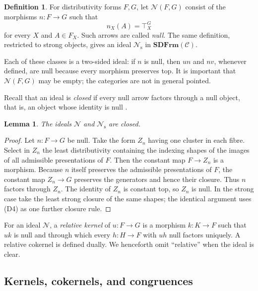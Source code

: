 \documentclass[12pt,oneside,reqno]{amsart}
\newtheorem{lemma}[theorem]{Lemma}
\theoremstyle{definition}
\newtheorem{definition}[theorem]{Definition}
\theoremstyle{remark}
\newcommand{\C}{\mathcal C}
\newcommand{\SDFrm}{\mathbf{SDFrm}}
\newcommand{\Null}{\mathcal N}
\begin{document}
\begin{definition}\label{def:null-ideal}
For distributivity forms \(F,G\), let \(\Null(F,G)\) consist of the
morphisms \(n:F\to G\) such that
\[
                        n_X(A)=\top_X^G
\]
for every \(X\) and \(A\in F_X\).  Such arrows are called \emph{null}.
The same definition, restricted to strong objects, gives an ideal
\(\Null_{\mathrm s}\) in \(\SDFrm(\C)\).
\end{definition}

Each of these classes is a two-sided ideal: if \(n\) is null, then
\(un\) and \(nv\), whenever defined, are null because every morphism
preserves top.  It is important that \(\Null(F,G)\) may be empty; the
categories are not in general pointed.

Recall that an ideal is \emph{closed} if every null arrow factors
through a null object, that is, an object whose identity is null
\cite{GrandisRelative,GrandisBook}.

\begin{lemma}\label{lem:null-ideal-closed}
The ideals \(\Null\) and \(\Null_{\mathrm s}\) are closed.
\end{lemma}

\begin{proof}
Let \(n:F\to G\) be null.  Take the form \(Z_n\) having one cluster in
each fibre.  Select in \(Z_n\) the least distributivity containing the
indexing shapes of the images of all admissible presentations of \(F\).
Then the constant map \(F\to Z_n\) is a morphism.  Because \(n\) itself
preserves the admissible presentations of \(F\), the constant map
\(Z_n\to G\) preserves the generators and hence their closure.  Thus
\(n\) factors through \(Z_n\).  The identity of \(Z_n\) is constant top,
so \(Z_n\) is null.  In the strong case take the least strong closure of
the same shapes; the identical argument uses (D4) as one further closure
rule.
\end{proof}

For an ideal \(\Null\), a \emph{relative kernel} of \(u:F\to G\) is a
morphism \(k:K\to F\) such that \(uk\) is null and through which every
\(h:H\to F\) with \(uh\) null factors uniquely.  A relative cokernel is
defined dually.  We henceforth omit ``relative'' when the ideal is
clear.

\subsection{Kernels, cokernels, and congruences}
\end{document}
